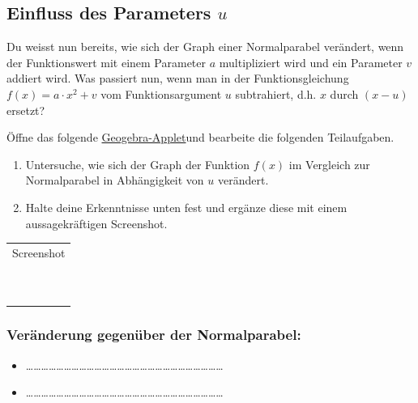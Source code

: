 \documentclass[11pt,oneside]{article}
\begin{document}
	\subsection{Einfluss des Parameters $u$}
	Du weisst nun bereits, wie sich der Graph einer Normalparabel verändert, wenn der Funktionswert mit einem Parameter $a$ multipliziert wird und ein Parameter $v$ addiert wird. Was passiert nun, wenn man in der Funktionsgleichung $f(x)=a\cdot x^2+v$ vom Funktionsargument $u$ subtrahiert, d.h. $x$ durch $(x-u)$ ersetzt?
	\begin{aufgabe}
		Öffne das folgende \href{https://www.geogebra.org/m/d7xzng3p}{Geogebra-Applet}\footnotemark\:und bearbeite die folgenden Teilaufgaben.
		\begin{enumerate}[label=\alph*)]
			\item Untersuche, wie sich der Graph der Funktion $f(x)$ im Vergleich zur Normalparabel in Abhängigkeit von $u$ verändert.
			\item Halte deine Erkenntnisse unten fest und ergänze diese mit einem aussagekräftigen Screenshot.
		\end{enumerate}
	\end{aufgabe}
	\vspace{0.5cm}
	\begin{table}[H]
		\centering
		\begin{tabular}{|p{15.6cm}|}\hline
			Screenshot\\
			\\
			\\
			\\
			\\
			\\
			\\
			\\
			\\
			\\
			\\ \hline
		\end{tabular}
	\end{table}
	\vspace{0.5cm}

\subsubsection*{Veränderung gegenüber der Normalparabel:}
	\begin{itemize}
		\item \ldots\ldots\ldots\ldots\ldots\ldots\ldots\ldots\ldots\ldots\ldots\ldots\ldots\ldots\ldots\ldots\ldots\ldots\ldots\ldots\ldots\ldots\ldots\ldots\ldots\ldots
		\item \ldots\ldots\ldots\ldots\ldots\ldots\ldots\ldots\ldots\ldots\ldots\ldots\ldots\ldots\ldots\ldots\ldots\ldots\ldots\ldots\ldots\ldots\ldots\ldots\ldots\ldots
	\end{itemize}
\newpage
\end{document}
